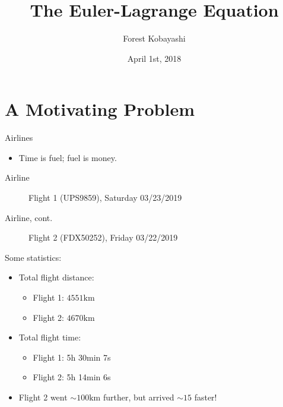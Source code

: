 \documentclass{fkpresentation}
\title{\textmd{The Euler-Lagrange Equation}}
\author{Forest Kobayashi}
\institute{Harvey Mudd College}
\date{April 1st, 2018}
\begin{document}
\frame{\titlepage}
\section{A Motivating Problem}

\begin{frame}{Airlines}
  \begin{itemize}
    \item Time is fuel; fuel is money.
  \end{itemize}
\end{frame}

\begin{frame}{Airline}
  \begin{figure}[h]
    \centering
    \caption{Flight 1 (UPS9859), Saturday 03/23/2019}
  \end{figure}
\end{frame}

\begin{frame}{Airline, cont.}
  \begin{figure}[h]
    \centering
    \caption{Flight 2 (FDX50252), Friday 03/22/2019}
  \end{figure}
\end{frame}

\begin{frame}{Some statistics:}
  \begin{itemize}
    \item Total flight distance:
      \begin{itemize}
        \item Flight 1: $4551\si{\kilo\meter}$
        \item Flight 2: $4670\si{\kilo\meter}$
      \end{itemize}
    \item Total flight time:
      \begin{itemize}
        \item Flight 1: 5h 30min 7s
        \item Flight 2: 5h 14min 6s
      \end{itemize}
    \item Flight 2 went $\sim 100 \si{\kilo\meter}$ further, but arrived $\sim
      15$ faster!
  \end{itemize}
\end{frame}
\end{document}
